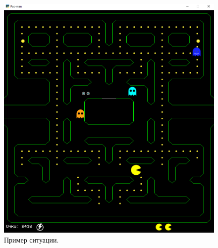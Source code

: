 \documentclass[14pt, oneside]{altsu-report}
\begin{document}
\begin{figure}[H]
	\centering
	\includegraphics[width=1\linewidth]{images/5.png}
	\caption{Пример ситуации.}
	\label{fig6}
\end{figure}
\end{document}
